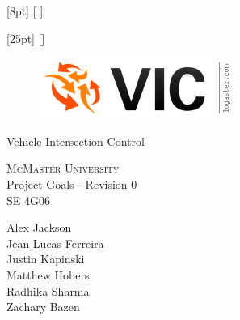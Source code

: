 \documentclass [12pt]{article}
\begin{document}
[8pt]                                               %
{}%
{\contentsmargin{2pt}                               %
     \thecontentslabel {\enspace }  %
    }
{\contentsmargin{0pt}\Large}                        %
{\contentspage} %
[ ] %

[25pt]                                               %
{}%
{\contentsmargin{0pt}                               %
    \thecontentslabel\enspace\enspace%
    }
{\contentsmargin{4pt}\large}                        %
{\contentspage} %
[] %




\begin {center} 
	
	\thispagestyle{empty}
	\vspace*{5cm}


	
	\begin {figure}[h!]
		\centering
		\includegraphics [scale = .5, trim={.4cm 0 .8cm 0},clip] {figures/vic_logo.png}
	\end {figure}

	{\fontfamily{\cabinfamily}\selectfont
	\Huge{Vehicle Intersection Control} }
	
	\vspace{1 cm}
	{\LARGE{\textsc{McMaster University}}\\}  \vspace {1cm}
	{\Large Project Goals - Revision 0 \\ \vspace {0.5 cm} SE 4G06}  \vspace {2cm}

	{
		Alex Jackson \\
		Jean Lucas Ferreira \\
		Justin Kapinski\\
		Matthew Hobers\\
		Radhika Sharma\\
		Zachary Bazen}

	

		
	\end{center}
\pagebreak
\end{document}
